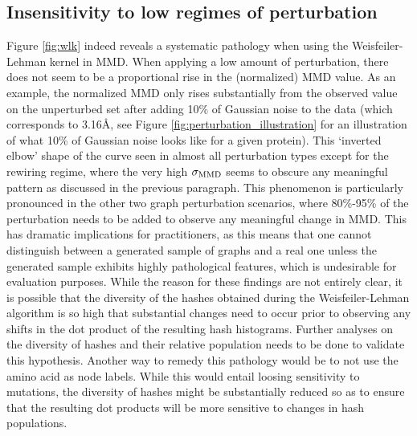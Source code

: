 \subsection{Insensitivity to low regimes of perturbation} Figure \ref{fig:wlk}
indeed reveals a systematic pathology when using the Weisfeiler-Lehman kernel in
MMD. When applying a low amount of perturbation, there does not seem to be a
proportional rise in the (normalized) MMD value. As an example, the normalized
MMD only rises substantially from the observed value on the unperturbed set
after adding 10\% of Gaussian noise to the data (which corresponds to
3.16\si{\angstrom}, see Figure \ref{fig:perturbation_illustration} for an
illustration of what 10\% of Gaussian noise looks like for a given protein).
This `inverted elbow' shape of the curve seen in almost all perturbation types
except for the rewiring regime, where the very high $\sigma_{\text{MMD}}$ seems to obscure
any meaningful pattern as discussed in the previous paragraph. This phenomenon
is particularly pronounced in the other two graph perturbation scenarios, where
80\%-95\% of the perturbation needs to be added to observe any meaningful change
in MMD. This has dramatic implications for practitioners, as this means that one
cannot distinguish between a generated sample of graphs and a real one unless
the generated sample exhibits highly pathological features, which is
undesirable for evaluation purposes. While the reason for these findings are not
entirely clear, it is possible that the diversity of the hashes obtained during
the Weisfeiler-Lehman algorithm is so high that substantial changes need to
occur prior to observing any shifts in the dot product of the resulting hash
histograms. Further analyses on the diversity of hashes and their relative
population needs to be done to validate this hypothesis. Another way to remedy
this pathology would be to not use the amino acid as node labels. While this
would entail loosing sensitivity to mutations, the diversity of hashes might be
substantially reduced so as to ensure that the resulting dot products will be
more sensitive to changes in hash populations.




